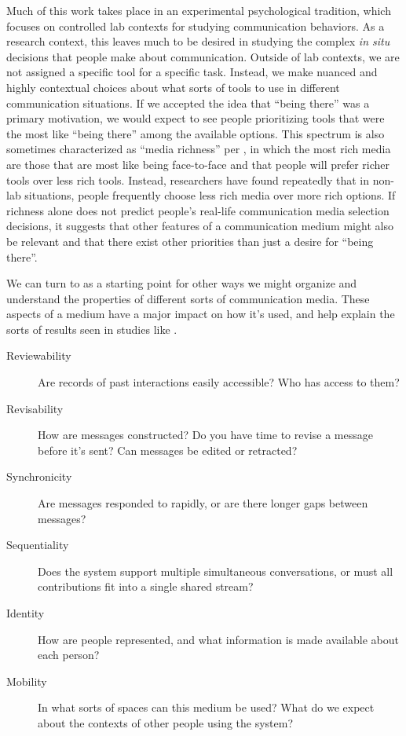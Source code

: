 Much of this work takes place in an experimental psychological tradition, which focuses on controlled lab contexts for studying communication behaviors. As a research context, this leaves much to be desired in studying the complex \emph{in situ} decisions that people make about communication. Outside of lab contexts, we are not assigned a specific tool for a specific task. Instead, we make nuanced and highly contextual choices about what sorts of tools to use in different communication situations. If we accepted the idea that ``being there'' was a primary motivation, we would expect to see people prioritizing tools that were the most like ``being there'' among the available options. This spectrum is also sometimes characterized as ``media richness'' per \citet{Daft:1986p1548}, in which the most rich media are those that are most like being face-to-face and that people will prefer richer tools over less rich tools. Instead, researchers have found repeatedly that in non-lab situations, people frequently choose less rich media over more rich options. \citep{Scholl:2006p210} If richness alone does not predict people's real-life communication media selection decisions, it suggests that other features of a communication medium might also be relevant and that there exist other priorities than just a desire for ``being there''.


We can turn to \citet{Brennan:1991wk} as a starting point for other ways we might organize and understand the properties of different sorts of communication media. These aspects of a medium have a major impact on how it's used, and help explain the sorts of results seen in studies like \citet{Scholl:2006p210}.

\begin{description}
\item [Reviewability]{Are records of past interactions easily accessible? Who has access to them?}
\item [Revisability]{How are messages constructed? Do you have time to revise a message before it's sent? Can messages be edited or retracted?}
\item [Synchronicity]{Are messages responded to rapidly, or are there longer gaps between messages?}
\item [Sequentiality]{Does the system support multiple simultaneous conversations, or must all contributions fit into a single shared stream?}
\item [Identity]{How are people represented, and what information is made available about each person?}
\item [Mobility]{In what sorts of spaces can this medium be used? What do we expect about the contexts of other people using the system?}
\end{description}


